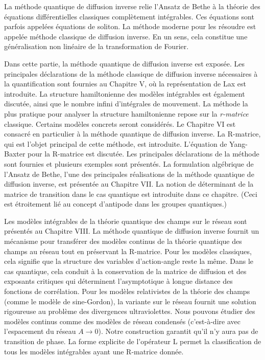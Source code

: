 

La méthode quantique de diffusion inverse relie l'Ansatz de Bethe à la théorie des équations différentielles classiques complètement intégrables. Ces équations sont parfois appelées équations de soliton. La méthode moderne pour les résoudre est appelée méthode classique de diffusion inverse. En un sens, cela constitue une généralisation non linéaire de la transformation de Fourier.

Dans cette partie, la méthode quantique de diffusion inverse est exposée. Les principales déclarations de la méthode classique de diffusion inverse nécessaires à la quantification sont fournies au Chapitre V, où la représentation de Lax est introduite. La structure hamiltonienne des modèles intégrables est également discutée, ainsi que le nombre infini d'intégrales de mouvement. La méthode la plus pratique pour analyser la structure hamiltonienne repose sur la \emph{r-matrice} classique. Certains modèles concrets seront considérés. Le Chapitre VI est consacré en particulier à la méthode quantique de diffusion inverse. La R-matrice, qui est l'objet principal de cette méthode, est introduite. L'équation de Yang-Baxter pour la R-matrice est discutée. Les principales déclarations de la méthode sont fournies et plusieurs exemples sont présentés. La formulation algébrique de l'Ansatz de Bethe, l'une des principales réalisations de la méthode quantique de diffusion inverse, est présentée au Chapitre VII. La notion de déterminant de la matrice de transition dans le cas quantique est introduite dans ce chapitre. (Ceci est étroitement lié au concept d'antipode dans les groupes quantiques.)

Les modèles intégrables de la théorie quantique des champs sur le réseau sont présentés au Chapitre VIII. La méthode quantique de diffusion inverse fournit un mécanisme pour transférer des modèles continus de la théorie quantique des champs au réseau tout en préservant la R-matrice. Pour les modèles classiques, cela signifie que la structure des variables d'action-angle reste la même. Dans le cas quantique, cela conduit à la conservation de la matrice de diffusion et des exposants critiques qui déterminent l'asymptotique à longue distance des fonctions de corrélation. Pour les modèles relativistes de la théorie des champs (comme le modèle de sine-Gordon), la variante sur le réseau fournit une solution rigoureuse au problème des divergences ultraviolettes. Nous pouvons étudier des modèles continus comme des modèles de réseau condensés (c'est-à-dire avec l'espacement du réseau \(A \rightarrow 0\)). Notre construction garantit qu'il n'y aura pas de transition de phase. La forme explicite de l'opérateur L permet la classification de tous les modèles intégrables ayant une R-matrice donnée.

